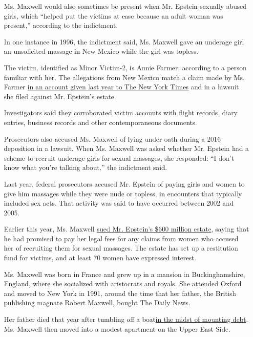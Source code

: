 Ms. Maxwell would also sometimes be present when Mr. Epstein sexually
abused girls, which ``helped put the victims at ease because an adult
woman was present,'' according to the indictment.

In one instance in 1996, the indictment said, Ms. Maxwell gave an
underage girl an unsolicited massage in New Mexico while the girl was
topless.

The victim, identified as Minor Victim-2, is Annie Farmer, according to
a person familiar with her. The allegations from New Mexico match a
claim made by Ms. Farmer
\href{https://www.nytimes3xbfgragh.onion/2019/08/26/us/epstein-farmer-sisters-maxwell.html}{in
an account given last year to The New York Times} and in a lawsuit she
filed against Mr. Epstein's estate.

Investigators said they corroborated victim accounts with
\href{https://www.nytimes3xbfgragh.onion/2019/07/26/nyregion/jeffrey-epstein-pilots.html}{flight
records}, diary entries, business records and other contemporaneous
documents.

Prosecutors also accused Ms. Maxwell of lying under oath during a 2016
deposition in a lawsuit. When Ms. Maxwell was asked whether Mr. Epstein
had a scheme to recruit underage girls for sexual massages, she
responded: ``I don't know what you're talking about,'' the indictment
said.

Last year, federal prosecutors accused Mr. Epstein of paying girls and
women to give him massages while they were nude or topless, in
encounters that typically included sex acts. That activity was said to
have occurred between 2002 and 2005.

Earlier this year, Ms. Maxwell
\href{https://www.nytimes3xbfgragh.onion/2020/03/18/business/jeffrey-epstein-ghislaine-maxwell-lawsuit.html}{sued
Mr. Epstein's \$600 million estate}, saying that he had promised to pay
her legal fees for any claims from women who accused her of recruiting
them for sexual massages. The estate has set up a restitution fund for
victims, and at least 70 women have expressed interest.

Ms. Maxwell was born in France and grew up in a mansion in
Buckinghamshire, England, where she socialized with aristocrats and
royals. She attended Oxford and moved to New York in 1991, around the
time that her father, the British publishing magnate Robert Maxwell,
bought The Daily News.

Her father died that year after tumbling off a
boat\href{https://www.nytimes3xbfgragh.onion/1991/12/20/business/maxwell-s-empire-it-grew-it-fell-special-report-charming-big-bankers-billions.html}{in
the midst of mounting debt}. Ms. Maxwell then moved into a modest
apartment on the Upper East Side.

